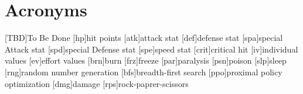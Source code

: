 
\chapter*{Acronyms}

\begin{acronym}
	[TBD]{To Be Done}
	[hp]{hit points}
	[atk]{attack stat}
	[def]{defense stat}
	[spa]{special Attack stat}
	[spd]{special Defense stat}
	[spe]{speed stat}
	[crit]{critical hit}
	[iv]{individual values}
	[ev]{effort values}
	[brn]{burn}
	[frz]{freeze}
	[par]{paralysis}
	[psn]{poison}
	[slp]{sleep}
	[rng]{random number generation}
	[bfs]{breadth-first search}
	[ppo]{proximal policy optimization}
	[dmg]{damage}
	[rps]{rock-paprer-scissors}
\end{acronym}